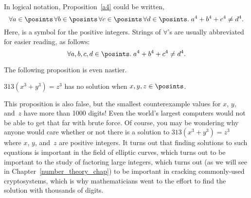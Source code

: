 In logical notation, Proposition~\ref{a4} could be written,
\[
\forall a \in \posints\, \forall b \in \posints\, \forall c \in
\posints\, \forall d \in \posints.\; a^4 + b^4 + c^4 \neq d^4.
\]
Here, \term{$\posints$} is a symbol for the positive integers.
Strings of $\forall$'s are usually abbreviated for easier reading, as
follows:
\[
\forall a, b, c, d \in \posints.\; a^4 + b^4 + c^4 \neq d^4.
\]

The following proposition is even nastier.
\begin{proposition}
$313 (x^3 + y^3) = z^3$ has no solution when $x, y, z\in\posints$.
\end{proposition}

This proposition is also false, but the smallest counterexample values
for $x$, $y$, and~$z$ have more than 1000 digits!  Even the world's
largest computers would not be able to get that far with brute force.
Of course, you may be wondering why anyone would care whether or not
there is a solution to $313 (x^3 + y^3) = z^3$ where $x$, $y$, and~$z$
are positive integers.  It turns out that finding solutions to such
equations is important in the field of elliptic curves, which turns
out to be important to the study of factoring large integers, which
turns out (as we will see in Chapter~\ref{number_theory_chap}) to be
important in cracking commonly-used cryptosystems, which is why
mathematicians went to the effort to find the solution with thousands
of digits.  

